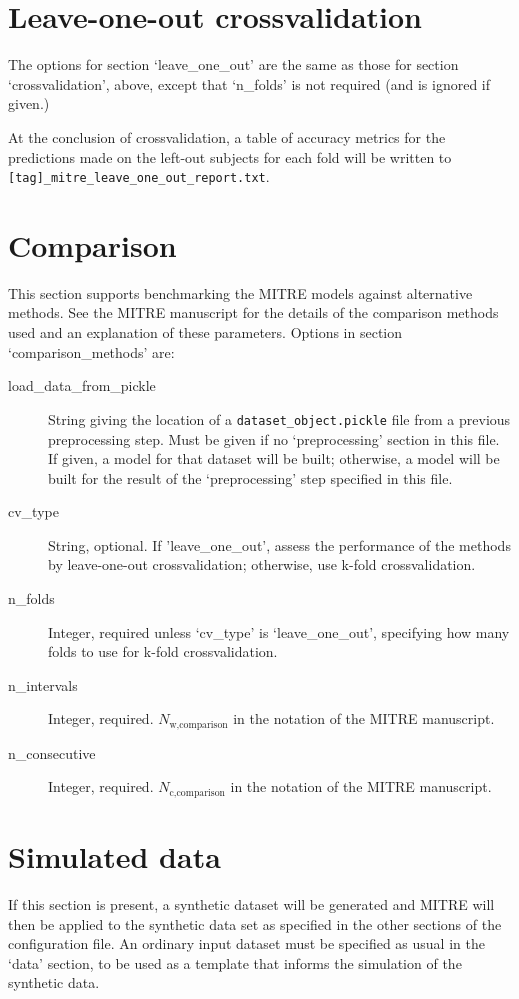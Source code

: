\documentclass[12pt]{report}
\begin{document}
\section{Leave-one-out crossvalidation}\label{leave_one_out}
The options for section `leave\_one\_out' are the same as those for
section `crossvalidation', above, except that `n\_folds' is not
required (and is ignored if given.)

At the conclusion of crossvalidation, a table of accuracy metrics for
the predictions made on the left-out subjects for each fold will be
written to \texttt{[tag]\_mitre\_leave\_one\_out\_report.txt}.


\section{Comparison}\label{comparison_methods}
This section supports benchmarking the MITRE models against
alternative methods.  See the MITRE manuscript for the details of the
comparison methods used and an explanation of these parameters.  Options
in section `comparison\_methods' are:
\begin{description}
\item[load\_data\_from\_pickle] String giving the location of a
  \texttt{dataset\_object.pickle} file from a previous preprocessing
  step. Must be given if no `preprocessing' section in this file. If
  given, a model for that dataset will be built; otherwise, a model
  will be built for the result of the `preprocessing' step specified
  in this file.
\item[cv\_type] String, optional. If 'leave\_one\_out', assess the performance
  of the methods by leave-one-out crossvalidation; otherwise,
  use k-fold crossvalidation.
\item[n\_folds] Integer, required unless `cv\_type' is `leave\_one\_out',
  specifying how many folds to use for k-fold crossvalidation.
\item[n\_intervals] Integer, required. $N_\text{w,comparison}$ in the
  notation of the MITRE manuscript.
\item[n\_consecutive] Integer, required. $N_\text{c,comparison}$ in
  the notation of the MITRE manuscript.
\end{description}

\section{Simulated data}\label{simulated_data}
If this section is present, a synthetic dataset will be generated and
MITRE will then be applied to the synthetic data set as specified in
the other sections of the configuration file. An ordinary input
dataset must be specified as usual in the `data' section, to be used
as a template that informs the simulation of the synthetic data.
\end{document}
